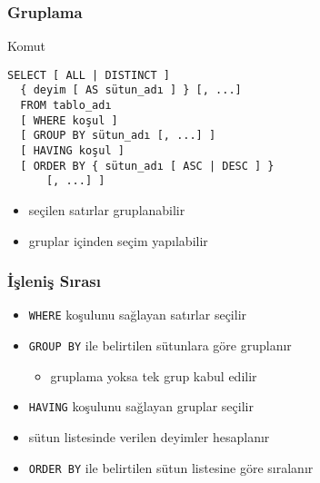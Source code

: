 \documentclass[dvipsnames]{beamer}
\theoremstyle{definition}
\theoremstyle{example}
\theoremstyle{plain}
\begin{document}
\begin{frame}[fragile]
  \frametitle{Gruplama}

  \begin{block}{Komut}
    \begin{lstlisting}
SELECT [ ALL | DISTINCT ]
  { deyim [ AS sütun_adı ] } [, ...]
  FROM tablo_adı
  [ WHERE koşul ]
  [ GROUP BY sütun_adı [, ...] ]
  [ HAVING koşul ]
  [ ORDER BY { sütun_adı [ ASC | DESC ] }
      [, ...] ]
    \end{lstlisting}
  \end{block}

  \pause
  \begin{itemize}
    \item seçilen satırlar gruplanabilir
    \item gruplar içinden seçim yapılabilir
  \end{itemize}
\end{frame}

\begin{frame}
  \frametitle{İşleniş Sırası}

  \begin{itemize}
    \item \lstinline!WHERE! koşulunu sağlayan satırlar seçilir

    \pause
    \item \lstinline!GROUP BY! ile belirtilen sütunlara göre gruplanır
    \begin{itemize}
      \item gruplama yoksa tek grup kabul edilir
    \end{itemize}

    \pause
    \item \lstinline!HAVING! koşulunu sağlayan gruplar seçilir

    \pause
    \item sütun listesinde verilen deyimler hesaplanır

    \pause
    \item \lstinline!ORDER BY! ile belirtilen sütun listesine göre sıralanır
  \end{itemize}
\end{frame}
\end{document}
